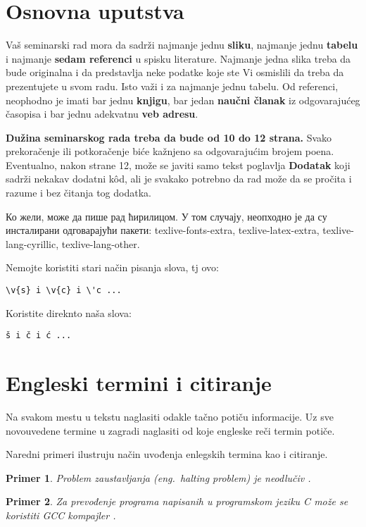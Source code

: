\documentclass[a4paper]{article}
\newtheorem{primer}{Primer}[section]
\begin{document}
\section{Osnovna uputstva}
Vaš seminarski rad mora da sadrži najmanje jednu \textbf{sliku}, najmanje jednu \textbf{tabelu} i najmanje \textbf{sedam referenci} u spisku literature. Najmanje jedna slika treba da bude originalna i da predstavlja neke podatke koje ste Vi osmislili da treba da prezentujete u svom radu. Isto važi i za najmanje jednu tabelu. 	Od referenci, neophodno je imati bar jednu \textbf{knjigu}, bar jedan \textbf{naučni članak} iz odgovarajućeg časopisa i bar jednu adekvatnu \textbf{veb adresu}. 

\textbf{Dužina seminarskog rada treba da bude od 10 do 12 strana.} Svako prekoračenje ili potkoračenje biće kažnjeno sa odgovarajućim brojem poena. Eventualno, nakon strane 12, može se javiti samo tekst poglavlja \textbf{Dodatak} koji sadrži nekakav dodatni k\^{o}d, ali je svakako potrebno da rad može da se pročita i razume i bez čitanja tog dodatka. 

Ко жели, може да пише рад ћирилицом. У том случају, неопходно је да су инсталирани одговарајући пакети: texlive-fonts-extra, texlive-latex-extra, texlive-lang-cyrillic, texlive-lang-other. 

Nemojte koristiti stari način pisanja slova, tj ovo:
\begin{verbatim}
\v{s} i \v{c} i \'c ...
\end{verbatim}
Koristite direknto naša slova:	
\begin{verbatim}
š i č i ć ... 
\end{verbatim}


\section{Engleski termini i citiranje}	
\label{sec:termini_i_citiranje}

Na svakom mestu u tekstu naglasiti odakle tačno potiču informacije. Uz sve novouvedene termine u zagradi naglasiti od koje engleske reči termin potiče. 

Naredni primeri ilustruju način uvođenja enlegskih termina kao i citiranje. \cite{horstmann2017core}

\begin{primer}
Problem zaustavljanja (eng.~{\em halting problem}) je neodlučiv \cite{haltingproblem}.
\end{primer}

\begin{primer}
Za prevođenje programa napisanih u programskom jeziku C može se koristiti GCC kompajler \cite{gcc}.
\end{primer}
\end{document}
